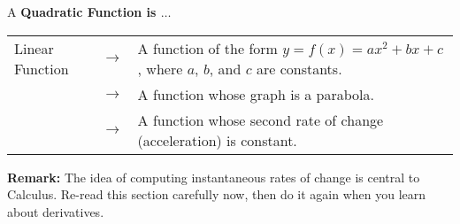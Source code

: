 \begin{center}
A {\bf Quadratic Function is $\ldots$}
\begin{tabular}{|p{1.5in} c p{2in}|}
\hline Linear Function & $\longrightarrow$ & A function of the form $y = f(x) = ax^2+bx+c$, where $a$, $b$, and $c$ are constants.\\
\ & $\longrightarrow$ & A function whose graph is a parabola.\\
\ & $\longrightarrow$ & A function whose second rate of change (acceleration) is constant. \\
\hline
\end{tabular}
\end{center}

{\bf Remark:} The idea of computing instantaneous rates of change is central to Calculus. Re-read this section carefully now, then do it again when you learn about derivatives. 


